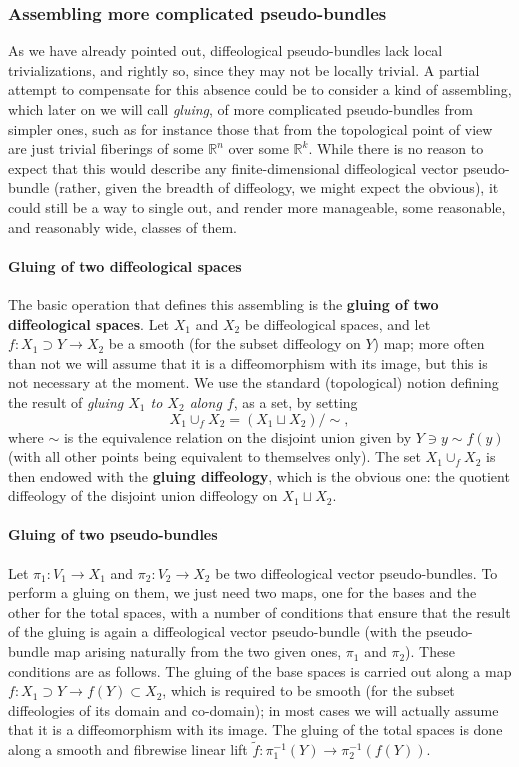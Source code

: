 \documentclass{article}
\newcommand\matR{{\mathbb{R}}}
\begin{document}
\subsubsection{Assembling more complicated pseudo-bundles}

As we have already pointed out, diffeological pseudo-bundles lack local trivializations, and rightly so, since they may not be locally  trivial. A partial attempt to compensate for this absence could be
to consider a kind of assembling, which later on we will call \emph{gluing}, of more complicated pseudo-bundles from simpler ones, such as for instance those that from the topological point of view
are just trivial fiberings of some $\matR^n$ over some $\matR^k$. While there is no reason to expect that this would describe any finite-dimensional diffeological vector pseudo-bundle (rather, given
the breadth of diffeology, we might expect the obvious), it could still be a way to single out, and render more manageable, some reasonable, and reasonably wide, classes of them.

\paragraph{Gluing of two diffeological spaces} The basic operation that defines this assembling is the \textbf{gluing of two diffeological spaces}. Let $X_1$ and $X_2$ be diffeological spaces, and let 
$f:X_1\supset Y\to X_2$ be a smooth (for the subset diffeology on $Y$) map; more often than not we will assume that it is a diffeomorphism with its image, but this is not necessary at the moment. We use 
the standard (topological) notion defining the result of \emph{gluing $X_1$ to $X_2$ along $f$}, as a set, by setting 
$$X_1\cup_f X_2=\left(X_1\sqcup X_2\right)/\sim,$$ where $\sim$ is the equivalence relation on the disjoint union given by $Y\ni y\sim f(y)$ (with all other points being equivalent to themselves only). 
The set $X_1\cup_f X_2$ is then endowed with the \textbf{gluing diffeology}, which is the obvious one: the quotient diffeology of the disjoint union diffeology on $X_1\sqcup X_2$.

\paragraph{Gluing of two pseudo-bundles} Let $\pi_1:V_1\to X_1$ and $\pi_2:V_2\to X_2$ be two diffeological vector pseudo-bundles. To perform a gluing on them, we just need two maps, one for the bases
and the other for the total spaces, with a number of conditions that ensure that the result of the gluing is again a diffeological vector pseudo-bundle (with the pseudo-bundle map arising naturally from the
two given ones, $\pi_1$ and $\pi_2$). These conditions are as follows. The gluing of the base spaces is carried out along a map $f:X_1\supset Y\to f(Y)\subset X_2$, which is required to be smooth
(for the subset diffeologies of its domain and co-domain); in most cases we will actually assume that it is a diffeomorphism with its image. The gluing of the total spaces is done along a smooth and
fibrewise linear lift $\tilde{f}:\pi_1^{-1}(Y)\to\pi_2^{-1}(f(Y))$.
\end{document}
